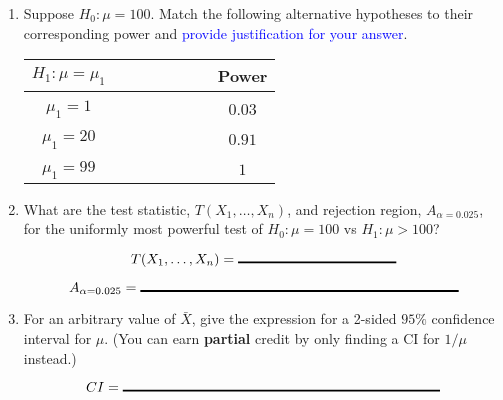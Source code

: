 \documentclass[12pt]{article}
\begin{document}
\begin{enumerate}[leftmargin=\labelsep]
\item Suppose $H_0: \mu = 100$. Match the following alternative hypotheses to their corresponding power and \textcolor{blue}{provide justification for your answer}. 


\begin{table}[h]
\centering 
\begin{tabular}{cccccccc}
$H_1: \mu = \mu_1$ & & & & & & & \textbf{Power} \\
\hline \\
$\mu_1 = 1$   &        &         &          &    & & & $0.03$      \\
              &        &         &          &    & & &      \\
$\mu_1 = 20$  &        &         &          &    & & &  $0.91$   \\
              &        &         &          &    & & &      \\
$\mu_1 = 99$ &        &         &          &    & & &  $1$ 
\end{tabular}
\end{table}
 
 

\item What are the test statistic, $T(X_1, \dots, X_n)$, and rejection region, $A_{\alpha = 0.025}$, for the uniformly most powerful test of $H_0: \mu = 100$ vs $H_1: \mu > 100$? 


$$T(X_1, \dots, X_n) = \rule{4cm}{0.5mm}$$


$$A_{\alpha = 0.025}= \rule{8cm}{0.5mm}$$


\item For an arbitrary value of $\bar{X}$, give the expression for a 2-sided $95\%$ confidence interval for $\mu$. (You can earn \textbf{partial} credit by only finding a CI for $1/\mu$ instead.) 

$$CI = \rule{8cm}{0.5mm}$$


\end{enumerate}
\end{document}
